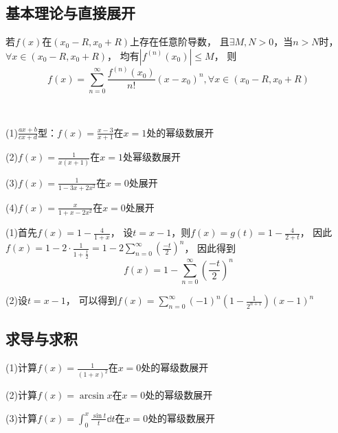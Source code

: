 \subsection{基本理论与直接展开}

\begin{theorem}[幂级数展开]
  若$f(x)$在$(x_0 - R, x_0 + R)$上存在任意阶导数，
  且$\exists M, N > 0$，当$n > N$时，$\forall x \in (x_0 - R, x_0 + R)$，
  均有$|f^{(n)}(x_0)| \leq M$，
  则
  \begin{equation*}
    f(x) = \sum\limits_{n = 0}^{\infty} \frac{f^{(n)}(x_0)}{n!}(x-x_0)^n, \forall x \in (x_0 - R, x_0 + R)
  \end{equation*}
\end{theorem}

~

\begin{exercise}[幂级数直接展开]
  (1)$\frac{ax + b}{cx + d}$型：$f(x) = \frac{x-3}{x+1}$在$x = 1$处的幂级数展开

  (2)$f(x) = \frac{1}{x(x+1)}$在$x = 1$处幂级数展开

  (3)$f(x) = \frac{1}{1 - 3x + 2x^2}$在$x = 0$处展开

  (4)$f(x) = \frac{x}{1 + x - 2x^2}$在$x = 0$处展开
\end{exercise}

\begin{solution}
  (1)首先$f(x) = 1 - \frac{4}{1+x}$，
  设$t = x - 1$，则$f(x) = g(t) = 1 - \frac{4}{2 + t}$，
  因此$f(x) = 1 - 2 \cdot \frac{1}{1 + \frac{t}{2}} = 1 - 2 \sum\limits_{n = 0}^{\infty}(\frac{-t}{2})^n$，
  因此得到
  \begin{equation*}
    f(x) = 1 - \sum\limits_{n = 0}^{\infty} \left( \frac{-t}{2} \right)^n
  \end{equation*}

  (2)设$t = x- 1$，
  可以得到$f(x) = \sum\limits_{n = 0}^{\infty} (-1)^n \left( 1 - \frac{1}{2^{n+1}} \right)(x-1)^n$
\end{solution}


\subsection{求导与求积}


\begin{exercise}[几个经典的积分与求导法]
  (1)计算$f(x) = \frac{1}{(1+x)^2}$在$x = 0$处的幂级数展开

  (2)计算$f(x) = \arcsin x$在$x = 0$处的幂级数展开

  (3)计算$f(x) = \int_0^x \frac{\sin t}{t}\mathbb{d} t$在$x = 0$处的幂级数展开
\end{exercise}

